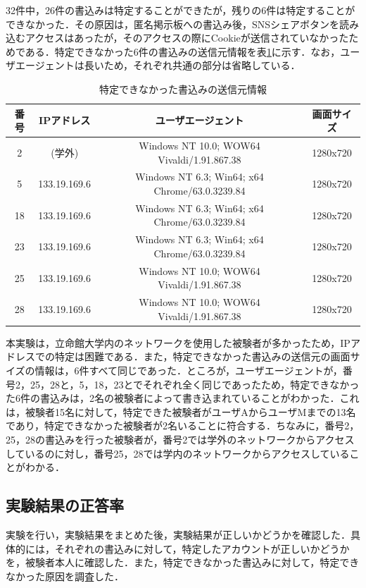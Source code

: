 \documentclass[10pt, a4paper]{jreport}
\begin{document}
32件中，26件の書込みは特定することができたが，残りの6件は特定することができなかった．その原因は，匿名掲示板への書込み後，SNSシェアボタンを読み込むアクセスはあったが，そのアクセスの際にCookieが送信されていなかったためである．特定できなかった6件の書込みの送信元情報を表\ref{tb: exp_result_untracked}に示す．なお，ユーザエージェントは長いため，それぞれ共通の部分は省略している．

\begin{table}[H]
	\caption{特定できなかった書込みの送信元情報}
	\label{tb: exp_result_untracked}
	\begin{center}
		\scalebox{0.85} {
			\begin{tabular}{ | c | c | c | c | } \hline

番号 & IPアドレス & ユーザエージェント & 画面サイズ \\ \hline
2 & (学外) & Windows NT 10.0; WOW64 Vivaldi/1.91.867.38 & 1280x720 \\ \hline
5 & 133.19.169.6 & Windows NT 6.3; Win64; x64 Chrome/63.0.3239.84 & 1280x720 \\ \hline
18 & 133.19.169.6 & Windows NT 6.3; Win64; x64 Chrome/63.0.3239.84 & 1280x720 \\ \hline
23 & 133.19.169.6 & Windows NT 6.3; Win64; x64 Chrome/63.0.3239.84 & 1280x720 \\ \hline
25 & 133.19.169.6 & Windows NT 10.0; WOW64 Vivaldi/1.91.867.38 & 1280x720 \\ \hline
28 & 133.19.169.6 & Windows NT 10.0; WOW64 Vivaldi/1.91.867.38 & 1280x720 \\ \hline

			\end{tabular}
		}
	\end{center}
\end{table}

本実験は，立命館大学内のネットワークを使用した被験者が多かったため，IPアドレスでの特定は困難である．また，特定できなかった書込みの送信元の画面サイズの情報は，6件すべて同じであった．ところが，ユーザエージェントが，番号2，25，28と，5，18，23とでそれぞれ全く同じであったため，特定できなかった6件の書込みは，2名の被験者によって書き込まれていることがわかった．これは，被験者15名に対して，特定できた被験者がユーザAからユーザMまでの13名であり，特定できなかった被験者が2名いることに符合する．ちなみに，番号2，25，28の書込みを行った被験者が，番号2では学外のネットワークからアクセスしているのに対し，番号25，28では学内のネットワークからアクセスしていることがわかる．

\subsection{実験結果の正答率}
実験を行い，実験結果をまとめた後，実験結果が正しいかどうかを確認した．具体的には，それぞれの書込みに対して，特定したアカウントが正しいかどうかを，被験者本人に確認した．また，特定できなかった書込みに対して，特定できなかった原因を調査した．
\end{document}
